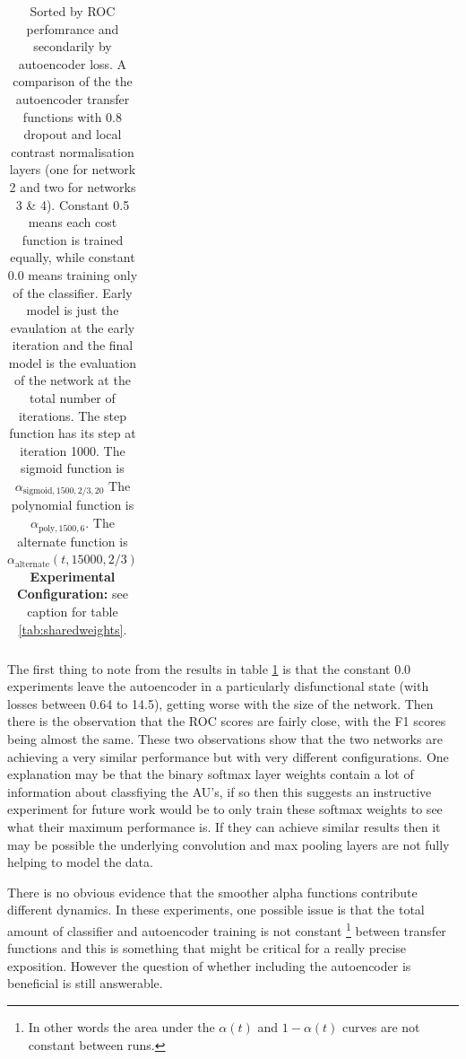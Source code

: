 \begin{table}[]
{\begin{tabular}{rrrrrrrrrrr}
      \hline
      \end{tabular}
      }
      \caption{Sorted by ROC perfomrance and secondarily by autoencoder loss.
      A comparison of the the autoencoder transfer functions with 0.8 dropout and local contrast normalisation layers (one for network 2 and two for networks 3 \& 4).
      Constant 0.5 means each cost function is trained equally, while constant 0.0 means training only of the classifier.
      Early model is just the evaulation at the early iteration and the final model is the evaluation of the network at the total number of iterations.
      The step function has its step at iteration 1000.
      The sigmoid function is $\alpha_{\text{sigmoid},1500,2/3,20}$
      The polynomial function is $\alpha_{\text{poly},1500,6}$.
      The alternate function is $\alpha_{\text{alternate}}(t,15000,2/3)$
      {\bf Experimental Configuration:} see caption for table \ref{tab:sharedweights}.} \label{tab:auto_final_1}
    \end{table}

      The first thing to note from the results in table \ref{tab:auto_final_1} is that
      the constant 0.0 experiments leave the autoencoder in a particularly disfunctional state (with losses between 0.64 to 14.5),
      getting worse with the size of the network. Then there is the observation that
      the ROC scores are fairly close, with the F1 scores being almost the same. These two
      observations show that the two networks are achieving a very similar performance but
      with very different configurations. One explanation may be that the binary softmax layer weights
      contain a lot of information about classfiying the AU's, if so then this suggests an
      instructive experiment for future work would be to only train these softmax weights to see
      what their maximum performance is. If they can achieve similar results then it may be possible
      the underlying convolution and max pooling layers are not fully helping to model the data.

      There is no obvious evidence that the smoother alpha functions contribute different
      dynamics. In these experiments, one possible issue is that
      the total amount of classifier and autoencoder training is not constant
      \footnote{In other words the area under the $\alpha(t)$ and $1-\alpha(t)$ curves are not constant between runs.}
      between transfer functions
      and this is something that might be critical for a really precise exposition. However the question of whether
      including the autoencoder is beneficial is still answerable.

